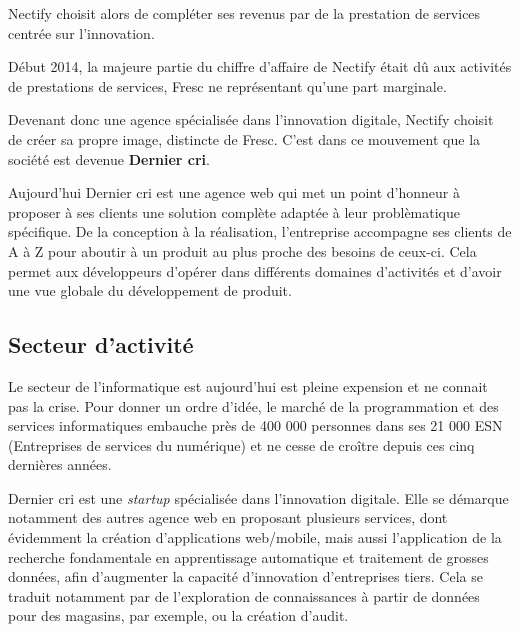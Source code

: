 \documentclass[12pt,a4paper]{article}
\begin{document}
  \bigskip

  Nectify choisit alors de compléter ses revenus par de la prestation de
  services centrée sur l'innovation.

  \bigskip

  Début 2014, la majeure partie du chiffre d'affaire de Nectify était dû
  aux activités de prestations de services, Fresc ne représentant qu'une
  part marginale.

  \bigskip

  Devenant donc une agence spécialisée dans l'innovation digitale, Nectify
  choisit de créer sa propre image, distincte de Fresc. C'est dans ce
  mouvement que la société est devenue \textbf{Dernier cri}.

  \bigskip

  Aujourd'hui Dernier cri est une agence web qui met un point d'honneur à
  proposer à ses clients une solution complète adaptée à leur
  problèmatique spécifique. De la conception à la réalisation,
  l'entreprise accompagne ses clients de A à Z pour aboutir à un produit
  au plus proche des besoins de ceux-ci. Cela permet aux développeurs
  d'opérer dans différents domaines d'activités et d'avoir une vue globale
  du développement de produit.

  \bigskip

  \subsection{Secteur d'activité}\label{secteur-dactivituxe9}

  \bigskip

  Le secteur de l'informatique est aujourd'hui est pleine expension et ne
  connait pas la crise. Pour donner un ordre d'idée, le marché de la
  programmation et des services informatiques embauche près de 400 000
  personnes dans ses 21 000 ESN (Entreprises de services du numérique) et
  ne cesse de croître depuis ces cinq dernières années.

  \bigskip

  Dernier cri est une \emph{startup} spécialisée dans l'innovation
  digitale. Elle se démarque notamment des autres agence web en proposant
  plusieurs services, dont évidemment la création d'applications
  web/mobile, mais aussi l'application de la recherche fondamentale en
  apprentissage automatique et traitement de grosses données, afin
  d'augmenter la capacité d'innovation d'entreprises tiers. Cela se
  traduit notamment par de l'exploration de connaissances à partir de
  données pour des magasins, par exemple, ou la création d'audit.
\end{document}
